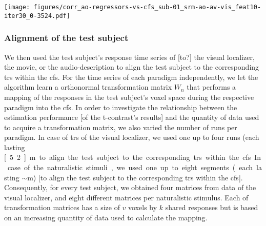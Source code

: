 \begin{figure*}[tbp]
\centering
    \texttt{[image: figures/corr\_ao-regressors-vs-cfs\_sub-01\_srm-ao-av-vis\_feat10-iter30\_0-3524.pdf]}
    \caption{
    \textbf{Correlations between regressors of the audio-description and share
    features.}
    Pearson correlation coefficients between regressors
    created in \citet{haeusler2022processing} to model hemodynamic responses to
    stimulus features of the audio-description
    \citep[cf. Table 3 in][]{haeusler2022processing}
    and the shared features within the \ac{cfs}
    (as calculated for subject 01 from $N-1$ training subjects in the first
    fold of the cross-validation).
    The time series of the \ac{cfs} were sliced to match the TRs of the
    audio-description.
    \texttt{geo\&groom} is a combination of
    regressors as used on the positive side of the primary contrasts aimed to
    localize the \ac{ppa} \citep[cf. Table 5 in][]{haeusler2022processing}.
    }
    \label{fig:corr-ao-reg-srm}
\end{figure*}






\subsubsection{Alignment of the test subject}




%
We then used the test subject's response time series of [to?] the visual
localizer, the movie, or the audio-description to align the test subject to the
corresponding \acp{tr} within the \ac{cfs}.
%
For the time series of each paradigm independently, we let the algorithm learn a
orthonormal transformation matrix $W_{n}$ that performs a mapping of the
responses in the test subject's voxel space during the respective paradigm into
the \ac{cfs}.
%
In order to investigate the relationship between the estimation performance [of
the t-contrast's results] and the quantity of data used to acquire a
transformation matrix, we also varied the number of runs per paradigm.
%
In case of \acp{tr} of the visual localizer, we used one up to four runs (each
lasting \unit[5.2]{m} to align the test subject to the corresponding \acp{tr}
within the \ac{cfs}.
%
In case of the naturalistic stimuli, we used one up to eight segments (each
lasting $\sim$\unit[15]{m}) [to align the test subject to the corresponding
\acp{tr} within the \ac{cfs}].
%
Consequently, for every test subject, we obtained four matrices from data of the
visual localizer, and eight different matrices per naturalistic stimulus.
%
Each of transformation matrices has a size of $v$ voxels by $k$ shared responses
but is based on an increasing quantity of data used to calculate the mapping.


